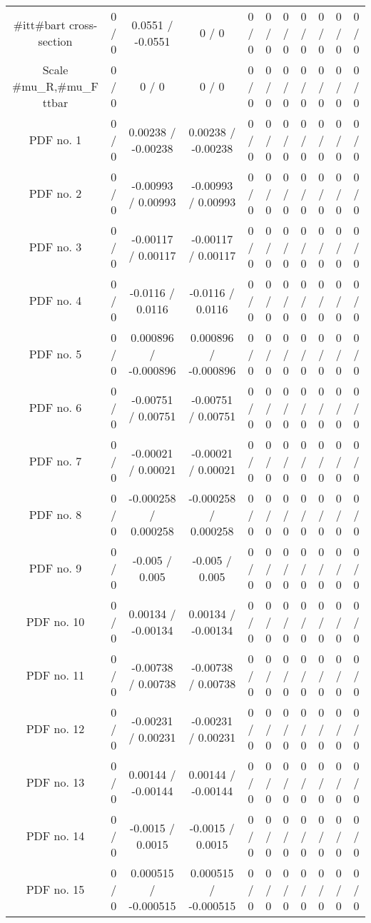 \begin{table}[htbp]
\begin{center}
\begin{tabular}{|c|c|c|c|c|c|c|c|c|c|c|}
  #it{t#bar{t}} cross-section & 0 / 0 & 0.0551 / -0.0551 & 0 / 0 & 0 / 0 & 0 / 0 & 0 / 0 & 0 / 0 & 0 / 0 & 0 / 0 & 0 / 0 \\ 
  Scale #mu_{R},#mu_{F} ttbar & 0 / 0 & 0 / 0 & 0 / 0 & 0 / 0 & 0 / 0 & 0 / 0 & 0 / 0 & 0 / 0 & 0 / 0 & 0 / 0 \\ 
  PDF no. 1 & 0 / 0 & 0.00238 / -0.00238 & 0.00238 / -0.00238 & 0 / 0 & 0 / 0 & 0 / 0 & 0 / 0 & 0 / 0 & 0 / 0 & 0 / 0 \\ 
  PDF no. 2 & 0 / 0 & -0.00993 / 0.00993 & -0.00993 / 0.00993 & 0 / 0 & 0 / 0 & 0 / 0 & 0 / 0 & 0 / 0 & 0 / 0 & 0 / 0 \\ 
  PDF no. 3 & 0 / 0 & -0.00117 / 0.00117 & -0.00117 / 0.00117 & 0 / 0 & 0 / 0 & 0 / 0 & 0 / 0 & 0 / 0 & 0 / 0 & 0 / 0 \\ 
  PDF no. 4 & 0 / 0 & -0.0116 / 0.0116 & -0.0116 / 0.0116 & 0 / 0 & 0 / 0 & 0 / 0 & 0 / 0 & 0 / 0 & 0 / 0 & 0 / 0 \\ 
  PDF no. 5 & 0 / 0 & 0.000896 / -0.000896 & 0.000896 / -0.000896 & 0 / 0 & 0 / 0 & 0 / 0 & 0 / 0 & 0 / 0 & 0 / 0 & 0 / 0 \\ 
  PDF no. 6 & 0 / 0 & -0.00751 / 0.00751 & -0.00751 / 0.00751 & 0 / 0 & 0 / 0 & 0 / 0 & 0 / 0 & 0 / 0 & 0 / 0 & 0 / 0 \\ 
  PDF no. 7 & 0 / 0 & -0.00021 / 0.00021 & -0.00021 / 0.00021 & 0 / 0 & 0 / 0 & 0 / 0 & 0 / 0 & 0 / 0 & 0 / 0 & 0 / 0 \\ 
  PDF no. 8 & 0 / 0 & -0.000258 / 0.000258 & -0.000258 / 0.000258 & 0 / 0 & 0 / 0 & 0 / 0 & 0 / 0 & 0 / 0 & 0 / 0 & 0 / 0 \\ 
  PDF no. 9 & 0 / 0 & -0.005 / 0.005 & -0.005 / 0.005 & 0 / 0 & 0 / 0 & 0 / 0 & 0 / 0 & 0 / 0 & 0 / 0 & 0 / 0 \\ 
  PDF no. 10 & 0 / 0 & 0.00134 / -0.00134 & 0.00134 / -0.00134 & 0 / 0 & 0 / 0 & 0 / 0 & 0 / 0 & 0 / 0 & 0 / 0 & 0 / 0 \\ 
  PDF no. 11 & 0 / 0 & -0.00738 / 0.00738 & -0.00738 / 0.00738 & 0 / 0 & 0 / 0 & 0 / 0 & 0 / 0 & 0 / 0 & 0 / 0 & 0 / 0 \\ 
  PDF no. 12 & 0 / 0 & -0.00231 / 0.00231 & -0.00231 / 0.00231 & 0 / 0 & 0 / 0 & 0 / 0 & 0 / 0 & 0 / 0 & 0 / 0 & 0 / 0 \\ 
  PDF no. 13 & 0 / 0 & 0.00144 / -0.00144 & 0.00144 / -0.00144 & 0 / 0 & 0 / 0 & 0 / 0 & 0 / 0 & 0 / 0 & 0 / 0 & 0 / 0 \\ 
  PDF no. 14 & 0 / 0 & -0.0015 / 0.0015 & -0.0015 / 0.0015 & 0 / 0 & 0 / 0 & 0 / 0 & 0 / 0 & 0 / 0 & 0 / 0 & 0 / 0 \\ 
  PDF no. 15 & 0 / 0 & 0.000515 / -0.000515 & 0.000515 / -0.000515 & 0 / 0 & 0 / 0 & 0 / 0 & 0 / 0 & 0 / 0 & 0 / 0 & 0 / 0 \\ 

\end{tabular}
\end{center}
\end{table}
